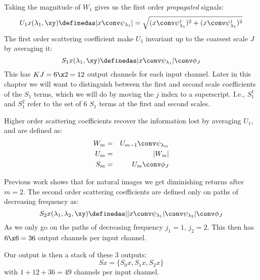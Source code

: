 Taking the magnitude of $W_1$ gives us the first order \emph{propagated}
signals:
\begin{equation}
  U_1x(\lambda_1, \xy) \definedas |x \conv \psi_{\lambda_1}| 
    = \sqrt{(x \conv \psi^r_{\lambda_1})^2 + (x \conv \psi^i_{\lambda_1})^2}
\end{equation}
The first order scattering coefficient make $U_1$ invariant up to 
the coarsest scale $J$ by averaging it:
\begin{equation}
  S_1x(\lambda_1, \xy) \definedas |x \conv \psi_{\lambda_1}| \conv \phi_J
\end{equation}
This has $KJ = 6\x 2 = 12$ output channels for each input channel. Later in this
chapter we will want to distinguish between the first and second scale
coefficients of the $S_1$ terms, which we will do by moving the $j$ index
to a superscript. I.e., $S_1^1$ and $S_1^2$ refer to the set of 6 $S_1$ terms
at the first and second scales.

Higher order scattering coefficients recover the information lost by
averaging $U_1$, and are defined as:
\begin{eqnarray}
  W_{m} &=& U_{m-1} \conv \psi_{\lambda_{m}} \\
  U_{m} &=& |W_{m}| \\
  S_{m} &=& U_m \conv \phi_J
\end{eqnarray}

Previous work shows that for natural images we get diminishing returns after
$m=2$. The second order scattering coefficients are defined only on paths of
decreasing frequency\cite{bruna_invariant_2013} as:
\begin{equation}
  S_2x(\lambda_1, \lambda_2, \xy) \definedas ||x \conv \psi_{\lambda_1}|
  \conv \psi_{\lambda_2}| \conv \phi_J
\end{equation}
As we only go on the paths of decreasing frequency $j_1 = 1$, $j_2=2$. This then
has $6\x6 = 36$ output channels per input channel.

Our output is then a stack of these 3 outputs:
\begin{equation}
  Sx = \{S_0x, S_1x, S_2x\}
\end{equation}
with $1+12+36=49$ channels per input channel.

